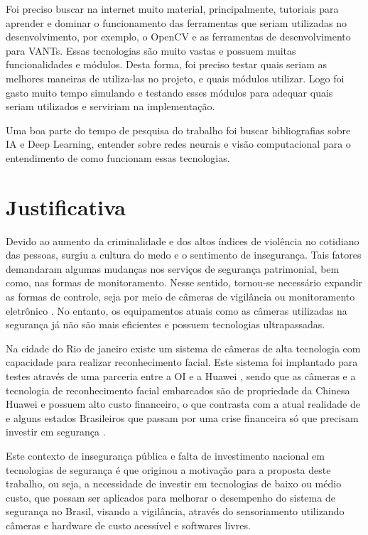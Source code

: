 Foi preciso buscar na internet muito material, principalmente, tutoriais para aprender e dominar o funcionamento das ferramentas que seriam utilizadas no desenvolvimento, por exemplo, o OpenCV e as ferramentas de desenvolvimento para VANTs. Essas tecnologias são muito vastas e possuem muitas funcionalidades e módulos. Desta forma, foi preciso testar quais seriam as melhores maneiras de utiliza-las no projeto, e quais módulos utilizar. Logo foi gasto muito tempo simulando e testando esses módulos para adequar quais seriam utilizados e serviriam na implementação.  

Uma boa parte do tempo de pesquisa  do trabalho foi buscar bibliografias sobre IA e Deep Learning, entender sobre redes neurais e visão computacional para o entendimento de como funcionam essas tecnologias.

\section{Justificativa} 
Devido ao aumento da criminalidade e dos altos índices de violência no cotidiano das pessoas, surgiu a cultura do medo e o sentimento de insegurança. Tais fatores demandaram algumas mudanças nos serviços de segurança patrimonial, bem como, nas formas de monitoramento. Nesse sentido, tornou-se necessário expandir as formas de controle, seja por meio de câmeras de vigilância ou monitoramento eletrônico \cite{quatro}. No entanto, os equipamentos atuais como as câmeras utilizadas na segurança já não são mais eficientes e possuem tecnologias ultrapassadas. 

Na cidade do Rio de janeiro existe um sistema de câmeras de alta tecnologia com capacidade para realizar reconhecimento facial. Este sistema foi implantado para testes através de uma parceria entre a OI e a Huawei \cite{cinco}, sendo que as câmeras e a tecnologia de reconhecimento facial embarcados são de propriedade da Chinesa Huawei e possuem alto custo financeiro, o que contrasta com a atual realidade de e alguns estados Brasileiros que passam por uma crise financeira só que  precisam investir em segurança \cite{seis}.

Este contexto de insegurança pública e falta de investimento nacional em tecnologias de segurança é que originou a motivação para a proposta deste trabalho, ou seja, a necessidade de investir em tecnologias de baixo ou médio custo, que possam ser aplicados para melhorar o desempenho do sistema de segurança no Brasil, visando a vigilância, através do sensoriamento utilizando câmeras e hardware de custo acessível e softwares livres.

